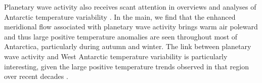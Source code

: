Planetary wave activity also receives scant attention in overviews and analyses of Antarctic temperature variability \citep[e.g.][]{Russell2010,SchneiderOkumura2012,Yu2012}. In the main, we find that the enhanced meridional flow associated with planetary wave activity brings warm air poleward and thus large positive temperature anomalies are seen throughout most of Antarctica, particularly during autumn and winter. The link between planetary wave activity and West Antarctic temperature variability is particularly interesting, given the large positive temperature trends observed in that region over recent decades \citep[e.g.][]{Bromwich2013}.  

